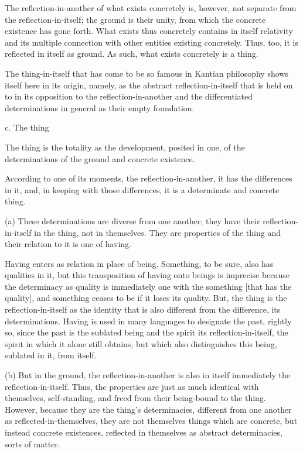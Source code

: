 The reflection-in-another of what exists concretely is,
however, not separate from the reflection-in-itself;
the ground is their unity, from which the concrete existence has gone forth.
What exists thus concretely contains in itself relativity and
its multiple connection with other entities existing concretely.
Thus, too, it is reflected in itself as ground.
As such, what exists concretely is a thing.

The thing-in-itself that has come to be so famous in
Kantian philosophy shows itself here in its origin, namely,
as the abstract reflection-in-itself that is held on to
in its opposition to the reflection-in-another and
the differentiated determinations in general
as their empty foundation.

c. The thing

The thing is the totality as the development, posited in one,
of the determinations of the ground and concrete existence.

According to one of its moments, the reflection-in-another,
it has the differences in it, and, in keeping with those differences,
it is a determinate and concrete thing.

(a) These determinations are diverse from one another;
they have their reflection-in-itself in the thing, not in themselves.
They are properties of the thing and their relation to it is one of having.

Having enters as relation in place of being.
Something, to be sure, also has qualities in it,
but this transposition of having onto
beings is imprecise because the determinacy as quality
is immediately one with the something [that has the quality], and
something ceases to be if it loses its quality.
But, the thing is the reflection-in-itself as
the identity that is also different from
the difference, its determinations.
Having is used in many languages to designate the past,
rightly so, since the past is the sublated being and
the spirit its reflection-in-itself,
the spirit in which it alone still obtains,
but which also distinguishes this being,
sublated in it, from itself.

(b) But in the ground, the reflection-in-another is also in itself immediately
the reflection-in-itself. Thus, the properties are just as much identical with
themselves, self-standing, and freed from their being-bound to the thing.
However, because they are the thing's determinacies, different from one
another as reflected-in-themselves, they are not themselves things which
are concrete, but instead concrete existences, reflected in themselves as
abstract determinacies, sorts of matter.


